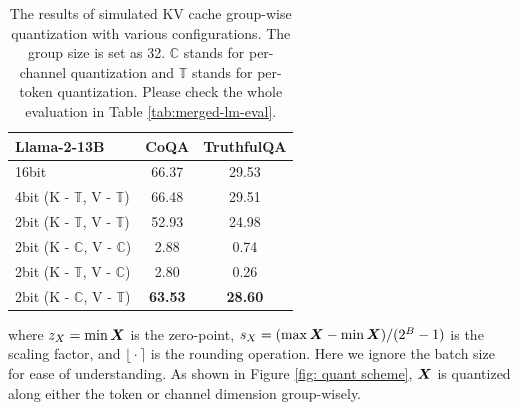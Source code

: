 \begin{table}
\centering
\small
\caption{The results of simulated KV cache group-wise quantization with various configurations. The group size is set as 32. $\mathbb{C}$ stands for per-channel quantization and $\mathbb{T}$ stands for per-token quantization. Please check the whole evaluation in Table \ref{tab:merged-lm-eval}.}
\vspace{-.5em}
\label{tab:sub_simulation}
\begin{tabular}{lcc} 
\toprule
\textbf{Llama-2-13B}                         & \multicolumn{1}{l}{\textbf{CoQA}} & \textbf{TruthfulQA}  \\ 
\midrule
16bit                               & 66.37                            & 29.53              \\
4bit (K - $\mathbb{T}$, V - $\mathbb{T}$)     & 66.48                            & 29.51              \\
\midrule
2bit (K - $\mathbb{T}$, V - $\mathbb{T}$)     & 52.93                             & 24.98              \\
2bit (K - $\mathbb{C}$, V - $\mathbb{C}$) & 2.88                            & 0.74               \\
2bit (K - $\mathbb{T}$, V - $\mathbb{C}$)   & 2.80                            & 0.26               \\
2bit (K - $\mathbb{C}$, V - $\mathbb{T}$)   & \textbf{63.53}                             & \textbf{28.60}              \\
\bottomrule
\end{tabular}
\end{table}

where $z_X=\min {\bm{X}}$ is the zero-point, $s_X=(\max {\bm{X}} - \min {\bm{X}})/(2^B - 1)$ is the scaling factor, and $\bm\lfloor\cdot\bm\rceil$ is the rounding operation. 
Here we ignore the batch size for ease of understanding.
As shown in Figure \ref{fig: quant scheme}, ${\bm{X}}$ is quantized along either the token or channel dimension group-wisely. 

